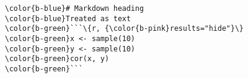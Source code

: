 \documentclass[class=minimal,border=0]{standalone}
\begin{document}
%
\begin{BVerbatim}[bgcolor=b-darkgrey]
\color{b-blue}# Markdown heading
\color{b-blue}Treated as text
\color{b-green}```\{r, {\color{b-pink}results="hide"}\}
\color{b-green}x <- sample(10)
\color{b-green}y <- sample(10)
\color{b-green}cor(x, y)
\color{b-green}```

\end{BVerbatim}
\end{document}
